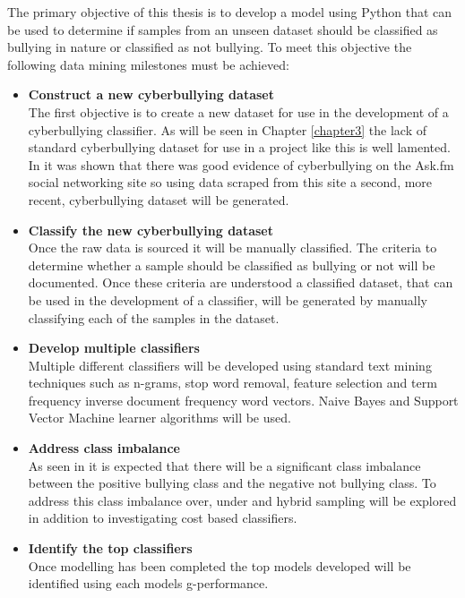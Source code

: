 The primary objective of this thesis is to develop a model using Python that can be used to determine if samples from an unseen dataset should be classified as bullying in nature or classified as not bullying. To meet this objective the following data mining milestones must be achieved:

\begin{itemize}

	\item \textbf{Construct a new cyberbullying dataset} \\
	The first objective is to create a new dataset for use in the development of a cyberbullying classifier. As will be seen in Chapter \ref{chapter3} the lack of standard cyberbullying dataset for use in a project like this is well lamented. In \citet{colton:2014} it was shown that there was good evidence of cyberbullying on the Ask.fm social networking site so using data scraped from this site a second, more recent, cyberbullying dataset will be generated. 
	
	\item \textbf{Classify the new cyberbullying dataset} \\
	Once the raw data is sourced it will be manually classified. The criteria to determine whether a sample should be classified as bullying or not will be documented. Once these criteria are understood a classified dataset, that can be used in the development of a classifier, will be generated by manually classifying each of the samples in the dataset.
	
	\item \textbf{Develop multiple classifiers} \\
	Multiple different classifiers will be developed using standard text mining techniques such as n-grams, stop word removal, feature selection and term frequency inverse document frequency word vectors. Naive Bayes and Support Vector Machine learner algorithms will be used. 
	
	\item \textbf{Address class imbalance} \\
	As seen in \citet{colton:2014} it is expected that there will be a significant class imbalance between the positive bullying class and the negative not bullying class. To address this class imbalance over, under and hybrid sampling will be explored in addition to investigating cost based classifiers.
	
	\item \textbf{Identify the top classifiers} \\
	Once modelling has been completed the top models developed will be identified using each models g-performance.
	

\end{itemize}
